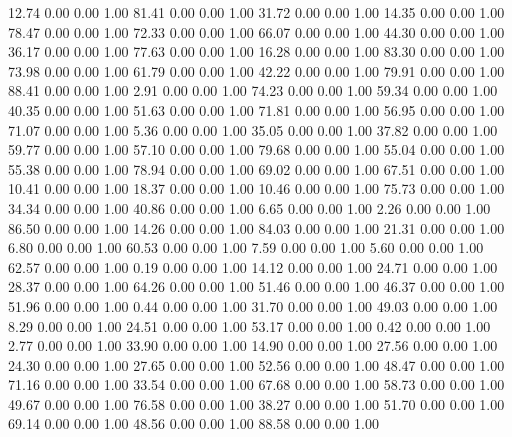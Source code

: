    12.74   0.00   0.00   1.00
   81.41   0.00   0.00   1.00
   31.72   0.00   0.00   1.00
   14.35   0.00   0.00   1.00
   78.47   0.00   0.00   1.00
   72.33   0.00   0.00   1.00
   66.07   0.00   0.00   1.00
   44.30   0.00   0.00   1.00
   36.17   0.00   0.00   1.00
   77.63   0.00   0.00   1.00
   16.28   0.00   0.00   1.00
   83.30   0.00   0.00   1.00
   73.98   0.00   0.00   1.00
   61.79   0.00   0.00   1.00
   42.22   0.00   0.00   1.00
   79.91   0.00   0.00   1.00
   88.41   0.00   0.00   1.00
    2.91   0.00   0.00   1.00
   74.23   0.00   0.00   1.00
   59.34   0.00   0.00   1.00
   40.35   0.00   0.00   1.00
   51.63   0.00   0.00   1.00
   71.81   0.00   0.00   1.00
   56.95   0.00   0.00   1.00
   71.07   0.00   0.00   1.00
    5.36   0.00   0.00   1.00
   35.05   0.00   0.00   1.00
   37.82   0.00   0.00   1.00
   59.77   0.00   0.00   1.00
   57.10   0.00   0.00   1.00
   79.68   0.00   0.00   1.00
   55.04   0.00   0.00   1.00
   55.38   0.00   0.00   1.00
   78.94   0.00   0.00   1.00
   69.02   0.00   0.00   1.00
   67.51   0.00   0.00   1.00
   10.41   0.00   0.00   1.00
   18.37   0.00   0.00   1.00
   10.46   0.00   0.00   1.00
   75.73   0.00   0.00   1.00
   34.34   0.00   0.00   1.00
   40.86   0.00   0.00   1.00
    6.65   0.00   0.00   1.00
    2.26   0.00   0.00   1.00
   86.50   0.00   0.00   1.00
   14.26   0.00   0.00   1.00
   84.03   0.00   0.00   1.00
   21.31   0.00   0.00   1.00
    6.80   0.00   0.00   1.00
   60.53   0.00   0.00   1.00
    7.59   0.00   0.00   1.00
    5.60   0.00   0.00   1.00
   62.57   0.00   0.00   1.00
    0.19   0.00   0.00   1.00
   14.12   0.00   0.00   1.00
   24.71   0.00   0.00   1.00
   28.37   0.00   0.00   1.00
   64.26   0.00   0.00   1.00
   51.46   0.00   0.00   1.00
   46.37   0.00   0.00   1.00
   51.96   0.00   0.00   1.00
    0.44   0.00   0.00   1.00
   31.70   0.00   0.00   1.00
   49.03   0.00   0.00   1.00
    8.29   0.00   0.00   1.00
   24.51   0.00   0.00   1.00
   53.17   0.00   0.00   1.00
    0.42   0.00   0.00   1.00
    2.77   0.00   0.00   1.00
   33.90   0.00   0.00   1.00
   14.90   0.00   0.00   1.00
   27.56   0.00   0.00   1.00
   24.30   0.00   0.00   1.00
   27.65   0.00   0.00   1.00
   52.56   0.00   0.00   1.00
   48.47   0.00   0.00   1.00
   71.16   0.00   0.00   1.00
   33.54   0.00   0.00   1.00
   67.68   0.00   0.00   1.00
   58.73   0.00   0.00   1.00
   49.67   0.00   0.00   1.00
   76.58   0.00   0.00   1.00
   38.27   0.00   0.00   1.00
   51.70   0.00   0.00   1.00
   69.14   0.00   0.00   1.00
   48.56   0.00   0.00   1.00
   88.58   0.00   0.00   1.00
